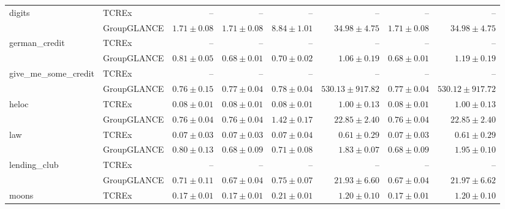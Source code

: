 \begin{table}[ht]
\begin{center}
\begin{sc}
\begin{scriptsize}
\begin{tabular}{l|l|rrrrrr}
\midrule
\multirow{2}{*}{digits} & TCREx & -- & -- & -- & -- & -- & -- \\
 & GroupGLANCE & $\boldsymbol{1.71\pm{0.08}}$ & $\boldsymbol{1.71\pm{0.08}}$ & $\boldsymbol{8.84\pm{1.01}}$ & $\boldsymbol{34.98\pm{4.75}}$ & $\boldsymbol{1.71\pm{0.08}}$ & $\boldsymbol{34.98\pm{4.75}}$ \\
\midrule
\multirow{2}{*}{german\_credit} & TCREx & -- & -- & -- & -- & -- & -- \\
 & GroupGLANCE & $\boldsymbol{0.81\pm{0.05}}$ & $\boldsymbol{0.68\pm{0.01}}$ & $\boldsymbol{0.70\pm{0.02}}$ & $\boldsymbol{1.06\pm{0.19}}$ & $\boldsymbol{0.68\pm{0.01}}$ & $\boldsymbol{1.19\pm{0.19}}$ \\
\midrule
\multirow{2}{*}{give\_me\_some\_credit} & TCREx & -- & -- & -- & -- & -- & -- \\
 & GroupGLANCE & $\boldsymbol{0.76\pm{0.15}}$ & $\boldsymbol{0.77\pm{0.04}}$ & $\boldsymbol{0.78\pm{0.04}}$ & $\boldsymbol{530.13\pm{917.82}}$ & $\boldsymbol{0.77\pm{0.04}}$ & $\boldsymbol{530.12\pm{917.72}}$ \\
\midrule
\multirow{2}{*}{heloc} & TCREx & $\boldsymbol{0.08\pm{0.01}}$ & $\boldsymbol{0.08\pm{0.01}}$ & $\boldsymbol{0.08\pm{0.01}}$ & $\boldsymbol{1.00\pm{0.13}}$ & $\boldsymbol{0.08\pm{0.01}}$ & $\boldsymbol{1.00\pm{0.13}}$ \\
 & GroupGLANCE & $0.76\pm{0.04}$ & $0.76\pm{0.04}$ & $1.42\pm{0.17}$ & $22.85\pm{2.40}$ & $0.76\pm{0.04}$ & $22.85\pm{2.40}$ \\
\midrule
\multirow{2}{*}{law} & TCREx & $\boldsymbol{0.07\pm{0.03}}$ & $\boldsymbol{0.07\pm{0.03}}$ & $\boldsymbol{0.07\pm{0.04}}$ & $\boldsymbol{0.61\pm{0.29}}$ & $\boldsymbol{0.07\pm{0.03}}$ & $\boldsymbol{0.61\pm{0.29}}$ \\
 & GroupGLANCE & $0.80\pm{0.13}$ & $0.68\pm{0.09}$ & $0.71\pm{0.08}$ & $1.83\pm{0.07}$ & $0.68\pm{0.09}$ & $1.95\pm{0.10}$ \\
\midrule
\multirow{2}{*}{lending\_club} & TCREx & -- & -- & -- & -- & -- & -- \\
 & GroupGLANCE & $\boldsymbol{0.71\pm{0.11}}$ & $\boldsymbol{0.67\pm{0.04}}$ & $\boldsymbol{0.75\pm{0.07}}$ & $\boldsymbol{21.93\pm{6.60}}$ & $\boldsymbol{0.67\pm{0.04}}$ & $\boldsymbol{21.97\pm{6.62}}$ \\
\midrule
\multirow{2}{*}{moons} & TCREx & $\boldsymbol{0.17\pm{0.01}}$ & $\boldsymbol{0.17\pm{0.01}}$ & $\boldsymbol{0.21\pm{0.01}}$ & $\boldsymbol{1.20\pm{0.10}}$ & $\boldsymbol{0.17\pm{0.01}}$ & $\boldsymbol{1.20\pm{0.10}}$ \\

\end{tabular}
\end{scriptsize}
\end{sc}
\end{center}
\end{table}

